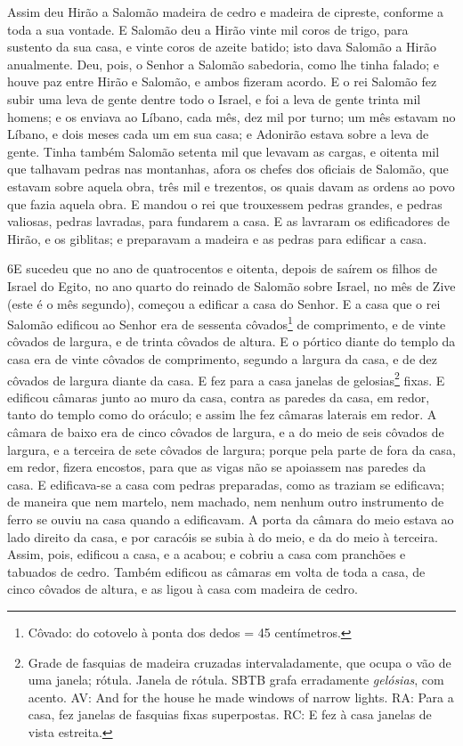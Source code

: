 Assim deu Hirão a Salomão madeira de cedro e madeira de cipreste,
conforme a toda a sua vontade. E Salomão deu a Hirão vinte
mil coros de trigo, para sustento da sua casa, e vinte coros de
azeite batido; isto dava Salomão a Hirão anualmente. Deu,
pois, o Senhor a Salomão sabedoria, como lhe tinha falado; e houve
paz entre Hirão e Salomão, e ambos fizeram acordo. E o rei
Salomão fez subir uma leva de gente dentre todo o Israel, e foi a
leva de gente trinta mil homens; e os enviava ao Líbano, cada
mês, dez mil por turno; um mês estavam no Líbano, e dois meses cada
um em sua casa; e Adonirão estava sobre a leva de gente.
Tinha também Salomão setenta mil que levavam as cargas, e
oitenta mil que talhavam pedras nas montanhas, afora os
chefes dos oficiais de Salomão, que estavam sobre aquela obra, três
mil e trezentos, os quais davam as ordens ao povo que fazia aquela
obra. E mandou o rei que trouxessem pedras grandes, e pedras
valiosas, pedras lavradas, para fundarem a casa. E as
lavraram os edificadores de Hirão, e os giblitas; e preparavam a
madeira e as pedras para edificar a casa.

\medskip

\lettrine{6} E sucedeu que no ano de quatrocentos e oitenta,
depois de saírem os filhos de Israel do Egito, no ano quarto do
reinado de Salomão sobre Israel, no mês de Zive (este é o mês
segundo), começou a edificar a casa do Senhor. E a casa que o
rei Salomão edificou ao Senhor era de sessenta
côvados\footnote{Côvado: do cotovelo à ponta dos dedos = 45
centímetros.} de comprimento, e de vinte côvados de largura, e de
trinta côvados de altura. E o pórtico diante do templo da casa
era de vinte côvados de comprimento, segundo a largura da casa, e de
dez côvados de largura diante da casa. E fez para a casa janelas
de gelosias\footnote{Grade de fasquias de madeira cruzadas
intervaladamente, que ocupa o vão de uma janela; rótula. Janela de
rótula. SBTB grafa erradamente \emph{gelósias}, com acento. AV: And
for the house he made windows of narrow lights. RA: Para a casa, fez
janelas de fasquias fixas superpostas. RC: E fez à casa janelas de
vista estreita.} fixas. E edificou câmaras junto ao muro da
casa, contra as paredes da casa, em redor, tanto do templo como do
oráculo; e assim lhe fez câmaras laterais em redor. A câmara de
baixo era de cinco côvados de largura, e a do meio de seis côvados
de largura, e a terceira de sete côvados de largura; porque pela
parte de fora da casa, em redor, fizera encostos, para que as vigas
não se apoiassem nas paredes da casa. E edificava-se a casa com
pedras preparadas, como as traziam se edificava; de maneira que nem
martelo, nem machado, nem nenhum outro instrumento de ferro se ouviu
na casa quando a edificavam. A porta da câmara do meio estava ao
lado direito da casa, e por caracóis se subia à do meio, e da do
meio à terceira. Assim, pois, edificou a casa, e a acabou; e
cobriu a casa com pranchões e tabuados de cedro. Também
edificou as câmaras em volta de toda a casa, de cinco côvados de
altura, e as ligou à casa com madeira de cedro.

